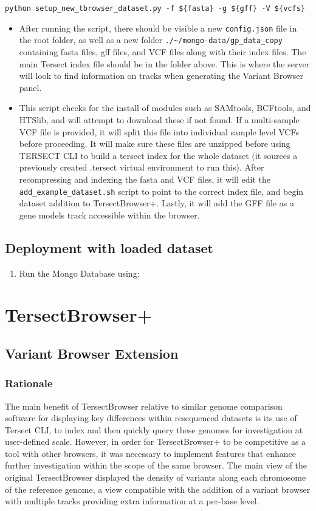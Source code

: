 \documentclass[12pt]{article}
\begin{document}
\begin{enumerate}
        \verb+python setup_new_tbrowser_dataset.py -f ${fasta} -g ${gff} -V ${vcfs}+
        \begin{itemize}
            \item After running the script, there should be visible a new \verb+config.json+ file in the root folder, as well as a new folder \verb+./~/mongo-data/gp_data_copy+ containing fasta files, gff files, and VCF files along with their index files. The main Tersect index file should be in the folder above. This is where the server will look to find information on tracks when generating the Variant Browser panel.
            \item This script checks for the install of modules such as SAMtools, BCFtools, and HTSlib, and will attempt to download these if not found. If a multi-sample VCF file is provided, it will split this file into individual sample level VCFs before proceeding. It will make sure these files are unzipped before using TERSECT CLI to build a tersect index for the whole dataset (it sources a previously created .tersect virtual environment to run this). After recompressing and indexing the fasta and VCF files, it will edit the \verb+add_example_dataset.sh+ script to point to the correct index file, and begin dataset addition to TersectBrowser+. Lastly, it will add the GFF file as a gene models track accessible within the browser.
        \end{itemize}
\end{enumerate}

\subsection{Deployment with loaded dataset}
\begin{enumerate}
    \item Run the Mongo Database using:
\end{enumerate}

\section{TersectBrowser+}
\subsection{Variant Browser Extension}
\label{sec:Browser}
\subsubsection{Rationale}
The main benefit of TersectBrowser relative to similar genome comparison software for displaying key differences within resequenced datasets is its use of Tersect CLI, to index and then quickly query these genomes for investigation at user-defined scale. However, in order for TersectBrowser+ to be competitive as a tool with other browsers, it was necessary to implement features that enhance further investigation within the scope of the same browser. The main view of the original TersectBrowser displayed the density of variants along each chromosome of the reference genome, a view compatible with the addition of a variant browser with multiple tracks providing extra information at a per-base level. 
\end{document}
